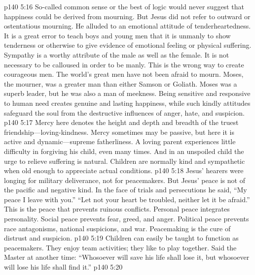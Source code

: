 \pc \vs p140 5:16 \bibnobreakspace {} So\hyp{}called common sense or the best of logic would never suggest that happiness could be derived from mourning. But Jesus did not refer to outward or ostentatious mourning. He alluded to an emotional attitude of tenderheartedness. It is a great error to teach boys and young men that it is unmanly to show tenderness or otherwise to give evidence of emotional feeling or physical suffering. Sympathy is a worthy attribute of the male as well as the female. It is not necessary to be calloused in order to be manly. This is the wrong way to create courageous men. The world’s great men have not been afraid to mourn. Moses, the mourner, was a greater man than either Samson or Goliath. Moses was a superb leader, but he was also a man of meekness. Being sensitive and responsive to human need creates genuine and lasting happiness, while such kindly attitudes safeguard the soul from the destructive influences of anger, hate, and suspicion.
\pc \vs p140 5:17 \bibnobreakspace {} Mercy here denotes the height and depth and breadth of the truest friendship---loving\hyp{}kindness. Mercy sometimes may be passive, but here it is active and dynamic---supreme fatherliness. A loving parent experiences little difficulty in forgiving his child, even many times. And in an unspoiled child the urge to relieve suffering is natural. Children are normally kind and sympathetic when old enough to appreciate actual conditions.
\pc \vs p140 5:18 \bibnobreakspace {} Jesus’ hearers were longing for military deliverance, not for peacemakers. But Jesus’ peace is not of the pacific and negative kind. In the face of trials and persecutions he said, \textcolor{ubdarkred}{“My peace I leave with you.” “Let not your heart be troubled, neither let it be afraid.”} This is the peace that prevents ruinous conflicts. Personal peace integrates personality. Social peace prevents fear, greed, and anger. Political peace prevents race antagonisms, national suspicions, and war. Peacemaking is the cure of distrust and suspicion.\plusone
\vs p140 5:19 Children can easily be taught to function as peacemakers. They enjoy team activities; they like to play together. Said the Master at another time: \textcolor{ubdarkred}{“Whosoever will save his life shall lose it, but whosoever will lose his life shall find it.”}
\pc \vs p140 5:20 \bibnobreakspace {}
